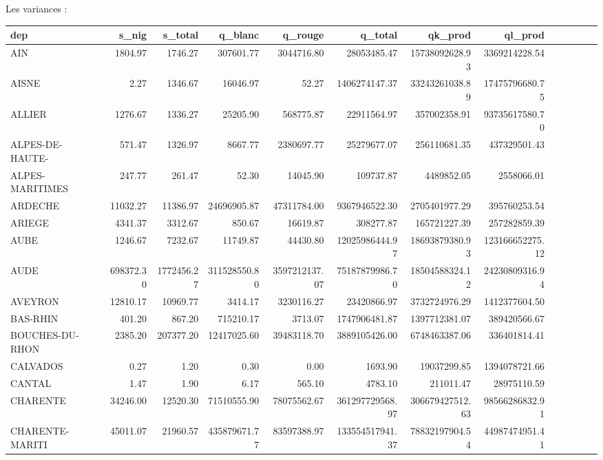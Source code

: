 \documentclass[11pt, a4paper]{article}
\begin{document}
\newpage
\begin{landscape}
Les variances :
\FloatBarrier
\begin{tabular}{lrrrrrrrrrrrr}
    \hline
    dep & s\_nig & s\_total & q\_blanc & q\_rouge & q\_total & qk\_prod & ql\_prod \\ 
    \hline
    AIN & 1804.97 & 1746.27 & 307601.77 & 3044716.80 & 28053485.47 & 15738092628.93 & 3369214228.54 \\ 
    AISNE & 2.27 & 1346.67 & 16046.97 & 52.27 & 1406274147.37 & 33243261038.89 & 17475796680.75 \\ 
    ALLIER & 1276.67 & 1336.27 & 25205.90 & 568775.87 & 22911564.97 & 357002358.91 & 93735617580.70 \\ 
    ALPES-DE-HAUTE- & 571.47 & 1326.97 & 8667.77 & 2380697.77 & 25279677.07 & 256110681.35 & 437329501.43 \\ 
    ALPES-MARITIMES & 247.77 & 261.47 & 52.30 & 14045.90 & 109737.87 & 4489852.05 & 2558066.01 \\ 
    ARDECHE & 11032.27 & 11386.97 & 24696905.87 & 47311784.00 & 9367946522.30 & 2705401977.29 & 395760253.54 \\ 
    ARIEGE & 4341.37 & 3312.67 & 850.67 & 16619.87 & 308277.87 & 165721227.39 & 257282859.39 \\ 
    AUBE & 1246.67 & 7232.67 & 11749.87 & 44430.80 & 12025986444.97 & 18693879380.93 & 123166652275.12 \\ 
    AUDE & 698372.30 & 1772456.27 & 311528550.80 & 3597212137.07 & 75187879986.70 & 18504588324.12 & 24230809316.94 \\ 
    AVEYRON & 12810.17 & 10969.77 & 3414.17 & 3230116.27 & 23420866.97 & 3732724976.29 & 1412377604.50 \\ 
    BAS-RHIN & 401.20 & 867.20 & 715210.17 & 3713.07 & 1747906481.87 & 1397712381.07 & 389420566.67 \\ 
    BOUCHES-DU-RHON & 2385.20 & 207377.20 & 12417025.60 & 39483118.70 & 3889105426.00 & 6748463387.06 & 336401814.41 \\ 
    CALVADOS & 0.27 & 1.20 & 0.30 & 0.00 & 1693.90 & 19037299.85 & 1394078721.66 \\ 
    CANTAL & 1.47 & 1.90 & 6.17 & 565.10 & 4783.10 & 211011.47 & 28975110.59 \\ 
    CHARENTE & 34246.00 & 12520.30 & 71510555.90 & 78075562.67 & 361297729568.97 & 306679427512.63 & 98566286832.91 \\ 
    CHARENTE-MARITI & 45011.07 & 21960.57 & 435879671.77 & 83597388.97 & 133554517941.37 & 78832197904.54 & 44987474951.41 \\ 

\end{tabular}
\end{landscape}
\end{document}
